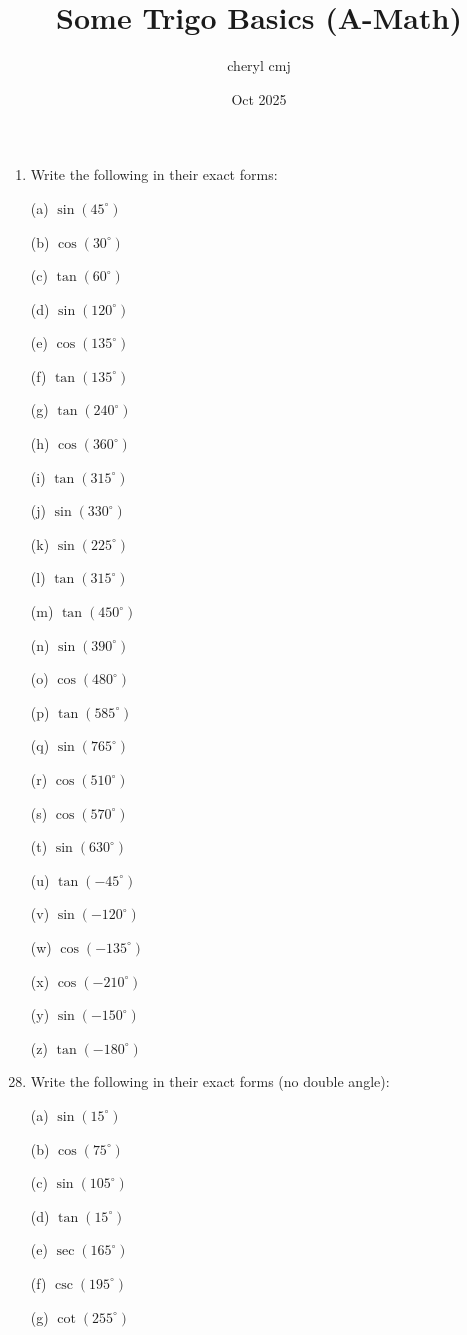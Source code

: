 \documentclass[14pt]{extarticle}
\title{Some Trigo Basics (A-Math)}
\author{cheryl cmj}
\date{Oct 2025}
\begin{document}
\maketitle

\begin{flushleft}
\begin{enumerate}
\item Write the following in their exact forms: 
    \item [(a)] $\sin (45^\circ)$
    \item [(b)] $\cos (30^\circ)$
    \item [(c)] $\tan (60^\circ)$
    \item [(d)] $\sin (120^\circ)$
    \item [(e)] $\cos (135^\circ)$
    \item [(f)] $\tan (135^\circ)$
    \item [(g)] $\tan (240^\circ)$
    \item [(h)] $\cos (360^\circ)$
    \item [(i)] $\tan (315^\circ)$
    \item [(j)] $\sin (330^\circ)$
    \item [(k)] $\sin (225^\circ)$
    \item [(l)] $\tan (315^\circ)$
    \item [(m)] $\tan (450^\circ)$
    \item [(n)] $\sin (390^\circ)$
    \item [(o)] $\cos (480^\circ)$
    \item [(p)] $\tan (585^\circ)$
    \item [(q)] $\sin (765^\circ)$
    \item [(r)] $\cos (510^\circ)$
    \item [(s)] $\cos (570^\circ)$
    \item [(t)] $\sin (630^\circ)$
    \item [(u)] $\tan (-45^\circ)$
    \item [(v)] $\sin (-120^\circ)$
    \item [(w)] $\cos (-135^\circ)$
    \item [(x)] $\cos (-210^\circ)$
    \item [(y)] $\sin (-150^\circ)$
    \item [(z)] $\tan (-180^\circ)$

\vspace{0.3 in}

\item Write the following in their exact forms (no double angle):
    \item [(a)] $\sin (15^\circ)$
    \item [(b)] $\cos (75^\circ)$
    \item [(c)] $\sin (105^\circ)$
    \item [(d)] $\tan (15^\circ)$
    \item [(e)] $\sec(165^\circ)$
    \item [(f)] $\csc(195^\circ)$
    \item [(g)] $\cot(255^\circ)$


\end{enumerate}
\end{flushleft}
\end{document}

